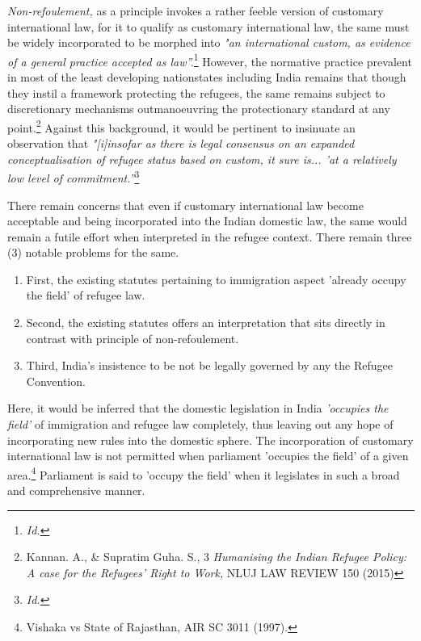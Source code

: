 \begin{multicols}{2}

\noi
\textit{Non-refoulement,} as a principle invokes a rather feeble version of customary international
law, for it to qualify as customary international law, the same must be widely incorporated to
be morphed into \textit{"an international custom, as evidence of a general practice accepted as
law”.}\footnote{\textit{Id.}} However, the normative practice prevalent in most of the least developing nationstates including India remains that though they instil a framework protecting the refugees, the
same remains subject to discretionary mechanisms outmanoeuvring the protectionary
standard at any point.\footnote{Kannan. A., \& Supratim Guha. S., 3 \textit{Humanising the Indian Refugee Policy: A case for the Refugees’ Right to Work,} NLUJ LAW REVIEW 150 (2015)} Against this background, it would be pertinent to insinuate an observation that \textit{"[i]insofar as there is legal consensus on an expanded conceptualisation of
refugee status based on custom, it sure is... 'at a relatively low level of commitment.”}\footnote{\textit{Id.}}


\noi
There remain concerns that even if customary international law become acceptable and being
incorporated into the Indian domestic law, the same would remain a futile effort when
interpreted in the refugee context. There remain three (3) notable problems for the same.

\begin{enumerate}[label=$\bullet$]
\item First, the existing statutes pertaining to immigration aspect 'already occupy the field'
of refugee law.

\item Second, the existing statutes offers an interpretation that sits directly in contrast with
principle of non-refoulement.

\item Third, India’s insistence to be not be legally governed by any the Refugee
Convention.
\end{enumerate}

\vspace{-.3cm}

\noi
Here, it would be inferred that the domestic legislation in India \textit{'occupies the field'} of
immigration and refugee law completely, thus leaving out any hope of incorporating new
rules into the domestic sphere. The incorporation of customary international law is not
permitted when parliament 'occupies the field' of a given area.\footnote{Vishaka vs State of Rajasthan, AIR SC 3011 (1997).} Parliament is said to 'occupy the field' when it legislates in such a broad and comprehensive manner.


\end{multicols}

